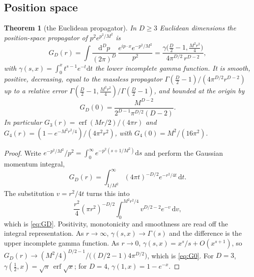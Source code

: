 \documentclass[aps,prd,10pt,twocolumn,superscriptaddress,nofootinbib,floatfix,longbibliography,showpacs,showkeys]{revtex4-2}
\theoremstyle{plain}
\newtheorem{theorem}{Theorem}
\theoremstyle{definition}
\theoremstyle{remark}
\newcommand{\erf}{\operatorname{erf}}
\newcommand{\dd}{\mathrm{d}}
\begin{document}
\subsection{Position space}

\begin{theorem}[the Euclidean propagator]
\label{thm:GD}
In $D\ge3$ Euclidean dimensions the position-space propagator of $p^2e^{p^2/M^2}$ is
\begin{equation}
\label{eq:GD}
G_D(r)=\int\frac{\dd^Dp}{(2\pi)^D}\,\frac{e^{ip\cdot x}e^{-p^2/M^2}}{p^2}
=\frac{\gamma\bigl(\tfrac D2-1,\tfrac{M^2r^2}{4}\bigr)}{4\pi^{D/2}\,r^{D-2}},
\end{equation}
with $\gamma(s,x)=\int_0^x t^{s-1}e^{-t}\dd t$ the lower incomplete gamma function. It is smooth, positive, decreasing, equal to the massless propagator $\Gamma(\tfrac D2-1)/(4\pi^{D/2}r^{D-2})$ up to a relative error $\Gamma(\tfrac D2-1,\tfrac{M^2r^2}4)/\Gamma(\tfrac D2-1)$, and bounded at the origin by
\begin{equation}
\label{eq:G0}
G_D(0)=\frac{M^{D-2}}{2^{D-1}\pi^{D/2}(D-2)} .
\end{equation}
In particular $G_3(r)=\erf(Mr/2)/(4\pi r)$ and $G_4(r)=(1-e^{-M^2r^2/4})/(4\pi^2r^2)$, with $G_4(0)=M^2/(16\pi^2)$.
\end{theorem}

\begin{proof}
Write $e^{-p^2/M^2}/p^2=\int_0^\infty e^{-p^2(s+1/M^2)}\dd s$ and perform the Gaussian momentum integral,
\[
G_D(r)=\int_{1/M^2}^{\infty}(4\pi t)^{-D/2}e^{-r^2/4t}\,\dd t .
\]
The substitution $v=r^2/4t$ turns this into
\[
\frac{r^2}{4}(\pi r^2)^{-D/2}\int_0^{M^2r^2/4}v^{D/2-2}e^{-v}\,\dd v,
\]
which is \eqref{eq:GD}. Positivity, monotonicity and smoothness are read off the integral representation. As $r\to\infty$, $\gamma(s,x)\to\Gamma(s)$ and the difference is the upper incomplete gamma function. As $r\to0$, $\gamma(s,x)=x^s/s+O(x^{s+1})$, so $G_D(r)\to(M^2/4)^{D/2-1}/\bigl((D/2-1)4\pi^{D/2}\bigr)$, which is \eqref{eq:G0}. For $D=3$, $\gamma(\tfrac12,x)=\sqrt\pi\,\erf\sqrt x$; for $D=4$, $\gamma(1,x)=1-e^{-x}$.
\end{proof}
\end{document}
